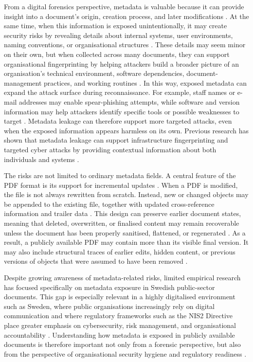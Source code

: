 \documentclass[conference]{IEEEtran}
\begin{document}
From a digital forensics perspective, metadata is valuable because it can provide insight into a document’s origin, creation process, and later modifications \cite{castiglione2010}. At the same time, when this information is exposed unintentionally, it may create security risks by revealing details about internal systems, user environments, naming conventions, or organisational structures \cite{adhatarao2021}. These details may seem minor on their own, but when collected across many documents, they can support organisational fingerprinting by helping attackers build a broader picture of an organisation’s technical environment, software dependencies, document-management practices, and working routines \cite{skrauca2026}. In this way, exposed metadata can expand the attack surface during reconnaissance. For example, staff names or e-mail addresses may enable spear-phishing attempts, while software and version information may help attackers identify specific tools or possible weaknesses to target \cite{adhatarao2021}. Metadata leakage can therefore support more targeted attacks, even when the exposed information appears harmless on its own. Previous research has shown that metadata leakage can support infrastructure fingerprinting and targeted cyber attacks by providing contextual information about both individuals and systems \cite{hasegawa2022}.

The risks are not limited to ordinary metadata fields. A central feature of the PDF format is its support for incremental updates \cite{castiglione2010}. When a PDF is modified, the file is not always rewritten from scratch. Instead, new or changed objects may be appended to the existing file, together with updated cross-reference information and trailer data \cite{castiglione2010}. This design can preserve earlier document states, meaning that deleted, overwritten, or finalised content may remain recoverable unless the document has been properly sanitised, flattened, or regenerated \cite{nsa2008, castiglione2010}. As a result, a publicly available PDF may contain more than its visible final version. It may also include structural traces of earlier edits, hidden content, or previous versions of objects that were assumed to have been removed \cite{garfinkel2014}.

Despite growing awareness of metadata-related risks, limited empirical research has focused specifically on metadata exposure in Swedish public-sector documents. This gap is especially relevant in a highly digitalised environment such as Sweden, where public organisations increasingly rely on digital communication and where regulatory frameworks such as the NIS2 Directive place greater emphasis on cybersecurity, risk management, and organisational accountability \cite{eu-nis2}. Understanding how metadata is exposed in publicly available documents is therefore important not only from a forensic perspective, but also from the perspective of organisational security hygiene and regulatory readiness \cite{skrauca2026}.
\end{document}
